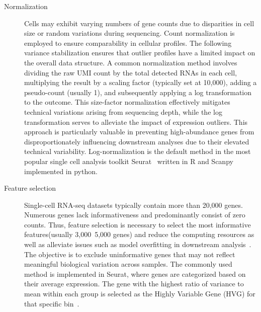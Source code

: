 \begin{description}
	\item[Normalization]
	Cells may exhibit varying numbers of gene counts due to disparities in cell size or random variations during sequencing. Count normalization is employed to ensure comparability in cellular profiles. The following variance stabilization ensures that outlier profiles have a limited impact on the overall data structure. A common normalization method involves dividing the raw UMI count by the total detected RNAs in each cell, multiplying the result by a scaling factor (typically set at 10,000), adding a pseudo-count (usually 1), and subsequently applying a log transformation to the outcome. This size-factor normalization effectively mitigates technical variations arising from sequencing depth, while the log transformation serves to alleviate the impact of expression outliers. This approach is particularly valuable in preventing high-abundance genes from disproportionately influencing downstream analyses due to their elevated technical variability. Log-normalization is the default method in the most popular single cell analysis toolkit Seurat~\citep{stuart2019seurat3} written in R and Scanpy~\citep{wolf2018scanpy} implemented in python.

	\item[Feature selection]
	Single-cell RNA-seq datasets typically contain more than 20,000 genes. Numerous genes lack informativeness and predominantly consist of zero counts. Thus, feature selection is necessary to select the most informative features(usually 3,000~5,000 genes) and reduce the computing resources as well as alleviate issues such as model overfitting in downstream analysis~\citep{yang2021feature}. The objective is to exclude uninformative genes that may not reflect meaningful biological variation across samples. The commonly used method is implemented in Seurat, where genes are categorized based on their average expression. The gene with the highest ratio of variance to mean within each group is selected as the Highly Variable Gene (HVG) for that specific bin~\citep{stuart2019seurat3}.
\end{description}

